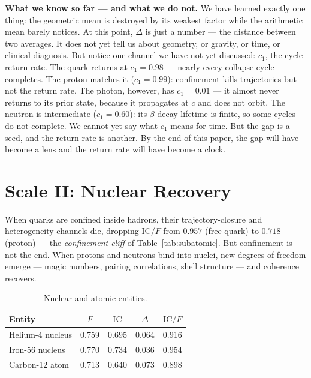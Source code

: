 \documentclass[
  aps,
  prd,
  twocolumn,
  superscriptaddress,
  nofootinbib,
  floatfix
]{revtex4-2}
\newcommand{\IC}{\mathrm{IC}}
\begin{document}
\textbf{What we know so far --- and what we do not.}
We have learned exactly one thing: the geometric mean is
destroyed by its weakest factor while the arithmetic mean
barely notices.  At this point, $\Delta$ is just a number ---
the distance between two averages.  It does not yet tell us
about geometry, or gravity, or time, or clinical diagnosis.
But notice one channel we have not yet discussed:
$c_1$, the cycle return rate.  The quark returns at
$c_1 = 0.98$ --- nearly every collapse cycle completes.
The proton matches it ($c_1 = 0.99$): confinement kills
trajectories but not the return rate.  The photon,
however, has $c_1 = 0.01$ --- it almost never returns to
its prior state, because it propagates at $c$ and does not
orbit.  The neutron is intermediate ($c_1 = 0.60$): its
$\beta$-decay lifetime is finite, so some cycles do not
complete.  We cannot yet say what $c_1$ means for time.
But the gap is a seed, and the return rate is another.
By the end of this paper, the gap will have become a lens
and the return rate will have become a clock.


\section{Scale II: Nuclear Recovery}\label{sec:nuclear}

When quarks are confined inside hadrons, their trajectory-closure
and heterogeneity channels die, dropping $\IC/F$ from $0.957$
(free quark) to $0.718$ (proton) --- the \emph{confinement cliff}
of Table~\ref{tab:subatomic}.  But confinement is not the end.
When protons and neutrons bind into nuclei, new degrees of
freedom emerge --- magic numbers, pairing correlations, shell
structure --- and coherence recovers.

\begin{table}[!htbp]
\caption{\label{tab:nuclear}Nuclear and atomic entities.}
\begin{ruledtabular}
\begin{tabular}{lcccc}
Entity & $F$ & $\IC$ & $\Delta$ & $\IC/F$ \\
\hline
Helium-4 nucleus   & 0.759 & 0.695 & 0.064 & 0.916 \\
Iron-56 nucleus    & 0.770 & 0.734 & 0.036 & 0.954 \\
Carbon-12 atom     & 0.713 & 0.640 & 0.073 & 0.898 \\
\end{tabular}
\end{ruledtabular}
\end{table}
\end{document}
